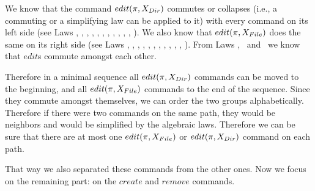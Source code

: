 
We know that the command \(edit(\pi,X_{Dir})\) commutes or collapses
(i.e., a commuting or a simplifying law can be applied to it) with
every command on its left side (see Laws \lawi, \lawip, \lawiv,
\lawvp, \lawvip,
\lawiiiap, \lawxiii, \lawxviii, \lawxix, \lawxxiv, \lawxxvi, \lawiib).
%
We also know that \(edit(\pi,X_{File})\) does the same on its right side
(see Laws \lawi, \lawip, \lawiv, \lawv, \lawvi, \lawiia, \lawiiib, \lawx,
\lawxi, \lawxii, \lawxxiv, \lawxxv).
%
From Laws \lawi, \lawip~and \lawxxiv~we know that \(edit\)s commute
amongst each other.

Therefore in a minimal sequence all \(edit(\pi,X_{Dir})\) commands can be
moved to the beginning, and all \(edit(\pi,X_{File})\) commands to the
end of the sequence. Since they commute amongst themselves, we can order
the two groups alphabetically. Therefore if there were two commands on
the same path, they would be neighbors and would be simplified by the
algebraic laws. 
Therefore we can be sure that there are at most one
\(edit(\pi,X_{File})\) or \(edit(\pi,X_{Dir})\) command on each path.

That way we also separated these commands from the other ones.
Now we focus on the remaining part: on the \(create\) and 
\(remove\) commands.

\label{theorem:crrm}

